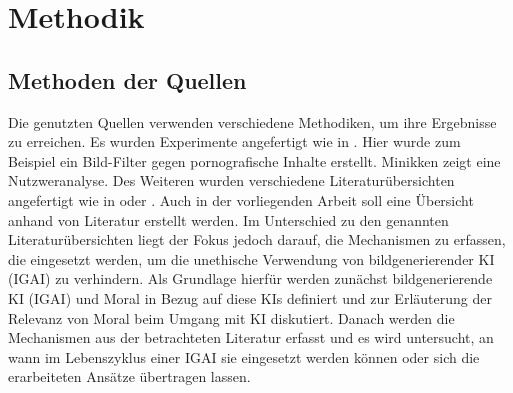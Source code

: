 \chapter{Methodik}

\section{Methoden der Quellen}
Die genutzten Quellen verwenden verschiedene Methodiken, um ihre Ergebnisse zu erreichen. Es wurden Experimente angefertigt wie in \cite{Zheng}. Hier wurde zum Beispiel ein Bild-Filter gegen pornografische Inhalte erstellt. Minikken \cite{Minkkinen} zeigt eine Nutzweranalyse. Des Weiteren wurden verschiedene Literaturübersichten angefertigt wie in \cite{Srinivasan} oder \cite{Jobin}.
Auch in der vorliegenden Arbeit soll eine Übersicht anhand von Literatur erstellt werden. Im Unterschied zu den genannten Literaturübersichten liegt der Fokus jedoch darauf, die Mechanismen zu erfassen, die eingesetzt werden, um die unethische Verwendung von bildgenerierender KI (IGAI) zu verhindern. Als Grundlage hierfür werden zunächst bildgenerierende KI (IGAI) und Moral in Bezug auf diese KIs definiert und zur Erläuterung der
Relevanz von Moral beim Umgang mit KI diskutiert. Danach werden die Mechanismen aus der betrachteten Literatur erfasst und es wird untersucht, an wann im Lebenszyklus einer IGAI sie eingesetzt werden können oder sich die erarbeiteten Ansätze übertragen lassen.